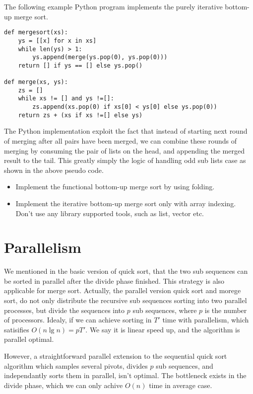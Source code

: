 \documentclass[UTF8]{article}
\begin{document}
The following example Python program implements the purely iterative bottom-up merge sort.

\lstset{language=Python}
\begin{lstlisting}
def mergesort(xs):
    ys = [[x] for x in xs]
    while len(ys) > 1:
        ys.append(merge(ys.pop(0), ys.pop(0)))
    return [] if ys == [] else ys.pop()

def merge(xs, ys):
    zs = []
    while xs != [] and ys !=[]:
        zs.append(xs.pop(0) if xs[0] < ys[0] else ys.pop(0))
    return zs + (xs if xs !=[] else ys)
\end{lstlisting}

The Python implementation exploit the fact that instead of starting next round of merging
after all pairs have been merged, we can combine these rounds of merging by consuming
the pair of lists on the head, and appending the merged result to the tail. This greatly simply
the logic of handling odd sub lists case as shown in the above pseudo code.

\begin{Exercise}
\begin{itemize}
\item Implement the functional bottom-up merge sort by using folding.
\item Implement the iterative bottom-up merge sort only with array indexing. Don't use any library
supported tools, such as list, vector etc.
\end{itemize}
\end{Exercise}

\section{Parallelism}
We mentioned in the basic version of quick sort, that the two sub sequences can be sorted in
parallel after the divide phase finished. This strategy is also applicable for merge sort.
Actually, the parallel version quick sort and morege sort, do not only distribute
the recursive sub sequences sorting into two parallel processes, but divide the sequences into
$p$ sub sequences, where $p$ is the number of processors. Idealy, if we can achieve
sorting in $T'$ time with parallelism, which satisifies $O(n \lg n) = p T'$. We say it
is linear speed up, and the algorithm is parallel optimal.

However, a straightforward parallel extension to the sequential quick sort algorithm
which samples several pivots, divides $p$ sub sequences, and independantly
sorts them in parallel, isn't optimal. The bottleneck exists in the
divide phase, which we can only achive $O(n)$ time in average case.
\end{document}
